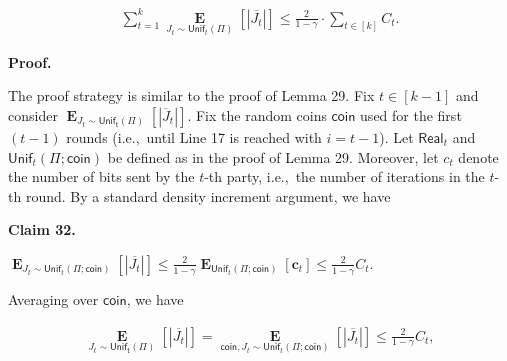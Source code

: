 \documentclass[10pt,a4paper]{article}
\begin{document}
\[\begin{gathered}
\sum_{t=1}^{k}\operatorname*{\mathbf{E}}_{J_{t}\sim\mathsf{Unif}_{t}(\Pi)}\left[|\overline{J_{t}}|\right]\leq\frac{2}{1-\gamma}\cdot\sum_{t\in[k]}C_{t}.
\end{gathered}\]






\par\medskip\noindent\textbf{Proof.}\par




The proof strategy is similar to the proof of Lemma 29.
Fix $t\in[k-1]$ and consider $\operatorname*{\mathbf{E}}_{J_{t}\sim\mathsf{Unif_{t}}(\Pi)}\left[|\overline{J}_{t}|\right]$.
Fix the random coins $\mathsf{coin}$ used for the first $(t-1)$ rounds (i.e., until Line 17 is reached with $i=t-1$). Let $\mathsf{Real}_{t}$ and $\mathsf{Unif}_{t}(\Pi;\mathsf{coin})$ be defined as in the proof of Lemma 29.
Moreover, let $c_{t}$ denote the number of bits sent by the $t$-th party, i.e., the number of iterations in the $t$-th round.
By a standard density increment argument, we have\par





\par\medskip\noindent\textbf{
Claim 32. 
}\par



$\operatorname*{\mathbf{E}}_{J_{t}\sim\mathsf{Unif}_{t}(\Pi;\mathsf{coin})}\left[|\overline{J_{t}}|\right]\leq\frac{2}{1-\gamma}\operatorname*{\mathbf{E}}_{\mathsf{Unif}_{t}(\Pi;\mathsf{coin})}\left[\bm{c}_{t}\right]\leq\frac{2}{1-\gamma}C_{t}$.\par






Averaging over $\mathsf{coin}$, we have\par


\[\begin{gathered}
\operatorname*{\mathbf{E}}_{J_{t}\sim\mathsf{Unif_{t}}(\Pi)}\left[|\overline{J_{t}}|\right]=\operatorname*{\mathbf{E}}_{\mathsf{coin},J_{t}\sim\mathsf{Unif}_{t}(\Pi;\mathsf{coin})}\left[|\overline{J_{t}}|\right]\leq\frac{2}{1-\gamma}C_{t},
\end{gathered}\]
\end{document}
